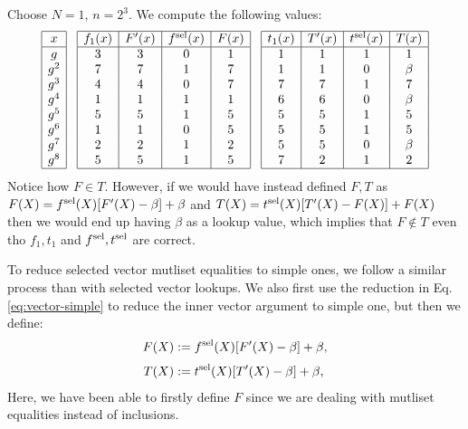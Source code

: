 \begin{example}
Choose $N=1$, $n=2^3$. We compute the following values:
\[
\begin{array}{|c|}
\hline
x	\\
\hline
g	\\
g^2	\\
g^3	\\
g^4	\\
g^5	\\
g^6	\\
g^7	\\
g^8	\\
\hline
\end{array}
\hspace{0.3cm}
\begin{array}{|c|c|c|c|}
\hline
f_1(x)	& F'(x) & f^{\text{sel}}(x) & F(x)	\\
\hline
3 & 3 & 0	& 1	\\
7 & 7 & 1	& 7	\\
4 & 4 & 0	& 7	\\
1 & 1 & 1	& 1	\\
5 & 5 & 1	& 5	\\
1 & 1 & 0	& 5	\\
2 & 2 & 1	& 2	\\
5 & 5 & 1	& 5	\\
\hline
\end{array}
\hspace{0.3cm}
\begin{array}{|c|c|c|c|}
\hline
t_1(x)	& T'(x) & t^{\text{sel}}(x) & T(x)	\\
\hline
1	& 1	& 1	& 1	\\
1	& 1	& 0	& \beta	\\
7	& 7	& 1	& 7	\\
6	& 6	& 0	& \beta	\\
5	& 5	& 1	& 5	\\
5	& 5 & 1	& 5	\\
5	& 5	& 0	& \beta	\\
7	& 2	& 1	& 2	\\
\hline
\end{array}
\]
Notice how $F \in T$. However, if we would have instead defined $F,T$ as
$F(X) = f^{\text{sel}}(X) [F'(X) - \beta] + \beta$ and $T(X) = t^{\text{sel}}(X) [T'(X) - F(X)] + F(X)$ then we would end up having $\beta$ as a lookup value, which implies that $F \notin T$ even tho $f_1,t_1$ and $f^{\text{sel}},t^{\text{sel}}$ are correct.
\end{example}

To reduce selected vector mutliset equalities to simple ones, we follow a similar process than with selected vector lookups. We also first use the reduction in Eq. \eqref{eq:vector-simple} to reduce the inner vector argument to simple one, but then we define:
\begin{align}\label{eq:F-T-sel-perm}
  \begin{split}
  F(X) &:= f^{\text{sel}}(X) [F'(X) - \beta] + \beta,\\[0.1cm]
  T(X) &:= t^{\text{sel}}(X) [T'(X) - \beta] + \beta, 
\end{split}
\end{align}
Here, we have been able to firstly define $F$ since we are dealing with mutliset equalities instead of inclusions.

